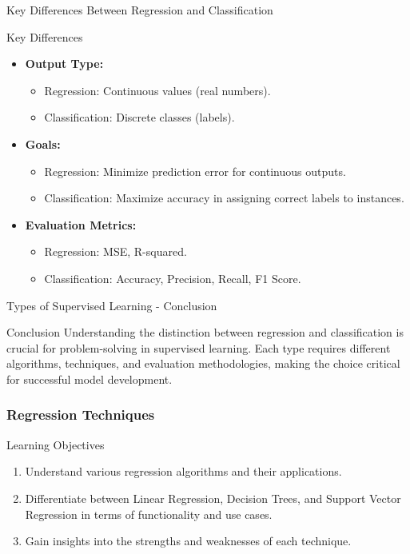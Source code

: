\documentclass[aspectratio=169]{beamer}
\begin{document}
\begin{frame}[fragile]{Key Differences Between Regression and Classification}
    \begin{block}{Key Differences}
        \begin{itemize}
            \item \textbf{Output Type:}
                \begin{itemize}
                    \item Regression: Continuous values (real numbers).
                    \item Classification: Discrete classes (labels).
                \end{itemize}
            \item \textbf{Goals:}
                \begin{itemize}
                    \item Regression: Minimize prediction error for continuous outputs.
                    \item Classification: Maximize accuracy in assigning correct labels to instances.
                \end{itemize}
            \item \textbf{Evaluation Metrics:}
                \begin{itemize}
                    \item Regression: MSE, R-squared.
                    \item Classification: Accuracy, Precision, Recall, F1 Score.
                \end{itemize}
        \end{itemize}
    \end{block}
\end{frame}

\begin{frame}[fragile]{Types of Supervised Learning - Conclusion}
    \begin{block}{Conclusion}
        Understanding the distinction between regression and classification is crucial for problem-solving in supervised learning. Each type requires different algorithms, techniques, and evaluation methodologies, making the choice critical for successful model development.
    \end{block}
\end{frame}

\begin{frame}[fragile]
    \frametitle{Regression Techniques}
    \begin{block}{Learning Objectives}
        \begin{enumerate}
            \item Understand various regression algorithms and their applications.
            \item Differentiate between Linear Regression, Decision Trees, and Support Vector Regression in terms of functionality and use cases.
            \item Gain insights into the strengths and weaknesses of each technique.
        \end{enumerate}
    \end{block}
\end{frame}
\end{document}
